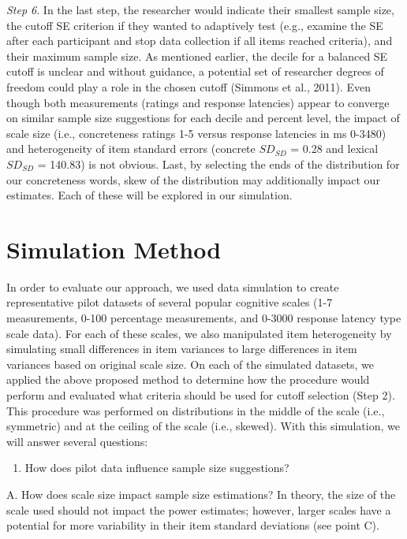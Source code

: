 \documentclass[
  man]{apa7}
\providecommand{\tightlist}{%
  \setlength{\itemsep}{0pt}\setlength{\parskip}{0pt}}
\begin{document}
\emph{Step 6}. In the last step, the researcher would indicate their smallest sample size, the cutoff SE criterion if they wanted to adaptively test (e.g., examine the SE after each participant and stop data collection if all items reached criteria), and their maximum sample size. As mentioned earlier, the decile for a balanced SE cutoff is unclear and without guidance, a potential set of researcher degrees of freedom could play a role in the chosen cutoff (Simmons et al., 2011). Even though both measurements (ratings and response latencies) appear to converge on similar sample size suggestions for each decile and percent level, the impact of scale size (i.e., concreteness ratings 1-5 versus response latencies in ms 0-3480) and heterogeneity of item standard errors (concrete \(SD_{SD}\) = 0.28 and lexical \(SD_{SD}\) = 140.83) is not obvious. Last, by selecting the ends of the distribution for our concreteness words, skew of the distribution may additionally impact our estimates. Each of these will be explored in our simulation.

\section{Simulation Method}\label{simulation-method}

In order to evaluate our approach, we used data simulation to create representative pilot datasets of several popular cognitive scales (1-7 measurements, 0-100 percentage measurements, and 0-3000 response latency type scale data). For each of these scales, we also manipulated item heterogeneity by simulating small differences in item variances to large differences in item variances based on original scale size. On each of the simulated datasets, we applied the above proposed method to determine how the procedure would perform and evaluated what criteria should be used for cutoff selection (Step 2). This procedure was performed on distributions in the middle of the scale (i.e., symmetric) and at the ceiling of the scale (i.e., skewed). With this simulation, we will answer several questions:

\begin{enumerate}
\def\labelenumi{\arabic{enumi})}
\tightlist
\item
  How does pilot data influence sample size suggestions?
\end{enumerate}

A. How does scale size impact sample size estimations? In theory, the size of the scale used should not impact the power estimates; however, larger scales have a potential for more variability in their item standard deviations (see point C).
\end{document}
